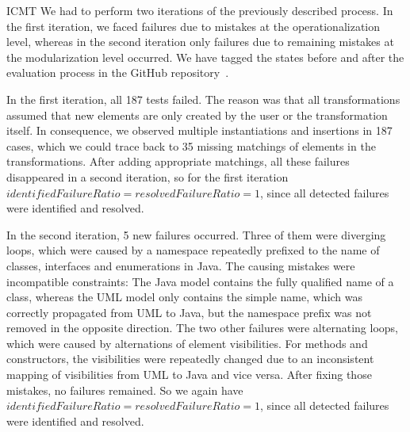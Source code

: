 \begin{copiedFrom}{ICMT}
We had to perform two iterations of the previously described process.
In the first iteration, we faced failures due to mistakes at the operationalization level, whereas in the second iteration only failures due to remaining mistakes at the modularization level occurred.
We have tagged the states before and after the evaluation process in the GitHub repository~\cite{vitruvCBSEGithub}.


In the first iteration, all 187 tests failed.
The reason was that all transformations assumed that new elements are only created by the user or the transformation itself.
In consequence, we observed multiple instantiations and insertions in 187 cases, which we could trace back to 35 missing matchings of elements in the transformations.
After adding appropriate matchings, all these failures disappeared in a second iteration, so for the first iteration $\mathit{identifiedFailureRatio = resolvedFailureRatio = 1}$, since all detected failures were identified and resolved.

In the second iteration, 5 new failures occurred.
Three of them were diverging loops, which were caused by a namespace repeatedly prefixed to the name of classes, interfaces and enumerations in Java.
The causing mistakes were incompatible constraints: The Java model contains the fully qualified name of a class, whereas the UML model only contains the simple name, which was correctly propagated from UML to Java, but the namespace prefix was not removed in the opposite direction.
The two other failures were alternating loops, which were caused by alternations of element visibilities.
For methods and constructors, the visibilities were repeatedly changed due to an inconsistent mapping of visibilities from UML to Java and vice versa.
After fixing those mistakes, no failures remained.
So we again have $\mathit{identifiedFailureRatio = resolvedFailureRatio = 1}$, since all detected failures were identified and resolved. 


\end{copiedFrom}
